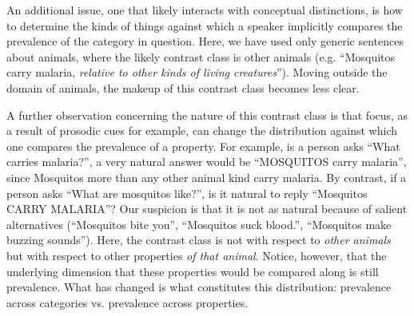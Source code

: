 \documentclass[10pt,letterpaper]{article}
\begin{document}
An additional issue, one that likely interacts with conceptual distinctions, is how to determine the kinds of things against which a speaker implicitly compares the prevalence of the category in question. Here, we have used only generic sentences about animals, where the likely contrast class is other animals (e.g. ``Mosquitos carry malaria, \emph{relative to other kinds of living creatures}''). Moving outside the domain of animals, the makeup of this contrast class becomes less clear. 


A further observation concerning the nature of this contrast class is that focus, as a result of prosodic cues for example, can change the distribution against which one compares the prevalence of a property. For example, is a person asks ``What carries malaria?'', a very natural answer would be ``MOSQUITOS carry malaria'', since Mosquitos more than any other animal kind carry malaria. By contrast, if a person asks ``What are mosquitos like?'', is it natural to reply ``Mosquitos CARRY MALARIA''? 
Our suspicion is that it is not as natural because of salient alternatives (``Mosquitos bite you'', ``Mosquitos suck blood.'', ``Mosquitos make buzzing sounds''). 
Here, the contrast class is not with respect to \emph{other animals} but with respect to other properties \emph{of that animal}. 
Notice, however, that the underlying dimension that these properties would be compared along is still prevalence. What has changed is what constitutes this distribution: prevalence across categories vs. prevalence across properties.
\end{document}

